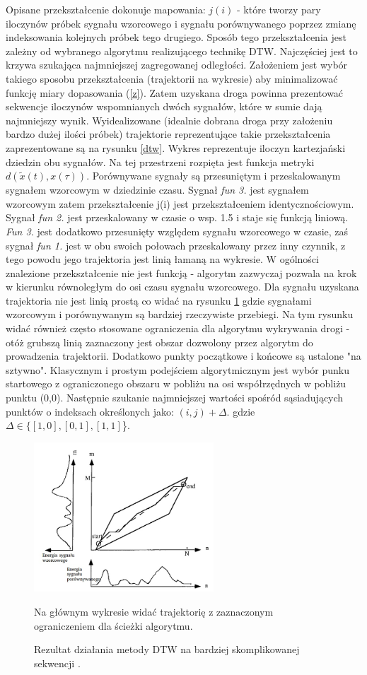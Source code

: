 Opisane przekształcenie dokonuje mapowania: $j(i)$ - które tworzy pary iloczynów próbek sygnału wzorcowego i sygnału porównywanego poprzez zmianę indeksowania kolejnych próbek tego drugiego. Sposób tego przekształcenia jest zależny od wybranego algorytmu realizującego technikę DTW. Najczęściej jest to krzywa szukająca najmniejszej zagregowanej odległości. Założeniem jest wybór takiego sposobu przekształcenia (trajektorii na wykresie) aby minimalizować funkcję miary dopasowania (\ref{z}). Zatem uzyskana droga powinna prezentować sekwencje iloczynów wspomnianych dwóch sygnałów, które w sumie dają najmniejszy wynik. Wyidealizowane (idealnie dobrana droga przy założeniu bardzo dużej ilości próbek) trajektorie reprezentujące takie przekształcenia zaprezentowane są na rysunku \ref{dtw}. Wykres reprezentuje iloczyn kartezjański dziedzin obu sygnałów. Na tej przestrzeni rozpięta jest funkcja metryki $d(\tilde{x}(t), x(\tau))$. Porównywane sygnały są przesuniętym i przeskalowanym sygnałem wzorcowym w dziedzinie czasu. Sygnał \textit{fun 3.} jest sygnałem wzorcowym zatem przekształcenie j(i) jest przekształceniem identycznościowym. Sygnał \textit{fun 2.} jest przeskalowany w czasie o wsp. 1.5 i staje się funkcją liniową. \textit{Fun 3.} jest dodatkowo przesunięty względem sygnału wzorcowego w czasie, zaś sygnał \textit{fun 1.} jest w obu swoich połowach przeskalowany przez inny czynnik, z tego powodu jego trajektoria jest linią łamaną na wykresie. W ogólności znalezione przekształcenie nie jest funkcją - algorytm zazwyczaj pozwala na krok w kierunku równoległym do osi czasu sygnału wzorcowego. Dla sygnału uzyskana trajektoria nie jest linią prostą co widać na rysunku \ref{dtwspeech} gdzie sygnałami wzorcowym i porównywanym są bardziej rzeczywiste przebiegi. Na tym rysunku widać również często stosowane ograniczenia dla algorytmu wykrywania drogi - otóż grubszą linią zaznaczony jest obszar dozwolony przez algorytm do prowadzenia trajektorii. Dodatkowo punkty początkowe i końcowe są ustalone "na sztywno". Klasycznym i prostym podejściem algorytmicznym jest wybór punku startowego z ograniczonego obszaru w pobliżu na osi współrzędnych w pobliżu punktu (0,0). Następnie szukanie najmniejszej wartości spośród sąsiadujących punktów o indeksach określonych jako: $(i, j) + \Delta.$ gdzie $ \Delta \in \{ [1,0], [0, 1], [1, 1]$\}. 
\begin{figure}[ht!]
  \centering
    \includegraphics[width=0.6\textwidth]{dtwspeech.jpg}
    \caption{\label{dtwspeech}Rezultat działania metody DTW na bardziej skomplikowanej sekwencji \cite{campbell}.} Na głównym wykresie widać trajektorię z zaznaczonym ograniczeniem dla ścieżki algorytmu.
\end{figure}
